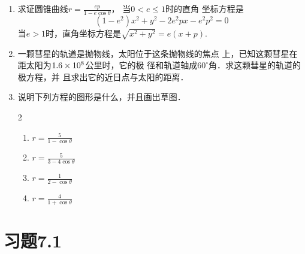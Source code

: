 \begin{ex}
\begin{enumerate}
    \item 求证圆锥曲线$r=\frac{ep}{1-e\cos\theta}$，
    当$0<e\le 1$时的直角
    坐标方程是
    \[(1-e^2)x^2+y^2-2e^2px-e^2p^2=0\]
    当$e>1$时，直角坐标方程是$\sqrt{x^2+y^2}=e(x+p)$.
    \item 一颗彗星的轨道是抛物线，太阳位于这条抛物线的焦点
    上，已知这颗彗星在距太阳为$1.6\times10^8$公里时，它的极
    径和轨道轴成$60^{\circ}$角．求这颗彗星的轨道的极方程，并
    且求出它的近日点与太阳的距离．
    \item 说明下列方程的图形是什么，并且画出草图．
\begin{multicols}{2}
    \begin{enumerate}
        \item $r=\frac{5}{1-\cos\theta}$
        \item $r=\frac{5}{3-4\cos\theta}$
        \item $r=\frac{1}{2-\cos\theta}$
        \item $r=\frac{4}{1+\cos\theta}$
    \end{enumerate}
\end{multicols}
\end{enumerate}
\end{ex}

\section*{习题7.1}

